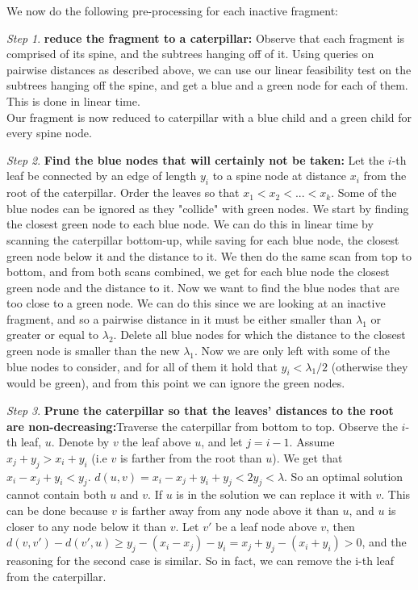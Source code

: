 \documentclass[11pt,a4paper]{article}
\theoremstyle{definition}
\theoremstyle{remark}
\newtheorem{step}{Step}[section]
\begin{document}
We now do the following pre-processing for each inactive fragment:
\begin{step}
\textbf{reduce the fragment to a caterpillar:}
Observe that each fragment is comprised of its spine, and the subtrees hanging off of it. Using queries on pairwise distances as described above, we can use our linear feasibility test on the subtrees hanging off the spine, and get a blue and a green node for each of them. This is done in linear time.\\
Our fragment is now reduced to caterpillar with a blue child and a green child for every spine node.
\end{step}
\begin{step}\label{removing green nodes}
\textbf{Find the blue nodes that will certainly not be taken:}
Let the $i$-th leaf be connected by an edge of length $y_i$ to a spine node at distance $x_i$ from the root of the caterpillar. Order the leaves so that $x_1 < x_2 < ... < x_k$.
Some of the blue nodes can be ignored as they "collide" with green nodes. We start by finding the closest green node to each blue node. We can do this in linear time by scanning the caterpillar bottom-up, while saving for each blue node, the closest green node below it and the distance to it. We then do the same scan from top to bottom, and from both scans combined, we get for each blue node the closest green node and the distance to it. Now we want to find the blue nodes that are too close to a green node. We can do this since we are looking at an inactive fragment, and so a pairwise distance in it must be either smaller than $\lambda_1$ or greater or equal to $\lambda_2$. Delete all blue nodes for which the distance to the closest green node is smaller than the new $\lambda_1$. 
Now we are only left with some of the blue nodes to consider, and for all of them it hold that $y_i < \lambda_1/2$ (otherwise they would be green), and from this point we can ignore the green nodes.
\end{step}
\begin{step}
\textbf{Prune the caterpillar so that the leaves' distances to the root are non-decreasing:}\label{making distances from the root monotone}
Traverse the caterpillar from bottom to top. Observe the $i$-th leaf, $u$. Denote by $v$ the leaf above $u$, and let  $j=i-1$. Assume $x_j+y_j > x_i+y_i$ (i.e $v$ is farther from the root than $u$). We get that $x_i-x_j+y_i < y_j$. $d(u,v) = x_i-x_j+y_i+y_j < 2y_j < \lambda$. So an optimal solution cannot contain both $u$ and $v$. If $u$ is in the solution we can replace it with $v$. This can be done because $v$ is farther away from any node above it than $u$, and $u$ is closer to any node below it than $v$. Let $v'$ be a leaf node above $v$, then $d(v,v') - d(v',u) \geq y_j-(x_i-x_j)-y_i = x_j+y_j-(x_i+y_i) > 0$, and the reasoning for the second case is similar.
So in fact, we can remove the i-th leaf from the caterpillar.
\end{step}
\end{document}
